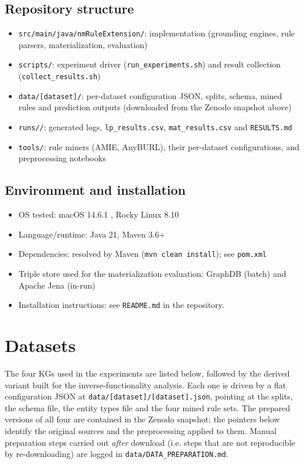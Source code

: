 \documentclass[runningheads]{llncs}
\begin{document}
\subsection{Repository structure}
\begin{itemize}
    \item \texttt{src/main/java/\allowbreak nmRuleExtension/}: implementation (grounding engines, rule parsers, materialization, evaluation)
    \item \texttt{scripts/}: experiment driver (\texttt{run\_experiments.sh}) and result collection (\texttt{collect\_results.sh})
    \item \texttt{data/[dataset]/}: per-dataset configuration JSON, splits, schema, mined rules and prediction outputs (downloaded from the Zenodo snapshot above)
    \item \texttt{runs/\allowbreak [timestamp]/}: generated logs, \texttt{lp\_results.csv}, \texttt{mat\_results.csv} and \texttt{RESULTS.md}
    \item \texttt{tools/}: rule miners (AMIE, AnyBURL), their per-dataset configurations, and preprocessing notebooks
\end{itemize}

\subsection{Environment and installation}\label{sec:env}
\begin{itemize}
    \item OS tested: macOS 14.6.1 , Rocky Linux 8.10
    \item Language/runtime: Java 21, Maven 3.6+
    \item Dependencies: resolved by Maven (\texttt{mvn clean install}); see \texttt{pom.xml}
    \item Triple store used for the materialization evaluation: GraphDB (batch) and Apache Jena (in-run)
    \item Installation instructions: see \texttt{README.md} in the repository.
\end{itemize}

\section{Datasets}\label{sec:datasets}

The four KGs used in the experiments are listed below, followed by the derived variant built for the
inverse-functionality analysis. Each one is driven by a flat configuration
JSON at \texttt{data/[dataset]/[dataset].json}, pointing at the splits, the schema file, the entity
types file and the four mined rule sets. The prepared versions of all four are contained in the
Zenodo snapshot; the pointers below identify the original sources and the preprocessing applied to
them. Manual preparation steps carried out \emph{after} download (i.e. steps that are not
reproducible by re-downloading) are logged in \texttt{data/DATA\_PREPARATION.md}.
\end{document}
